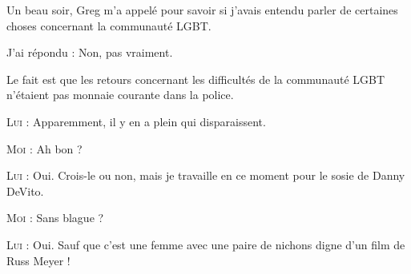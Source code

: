 Un beau soir, Greg m’a appelé pour savoir si j’avais entendu parler de certaines choses concernant la communauté LGBT.

\begin{dialogue}

J’ai répondu : Non, pas vraiment.

\end{dialogue}

Le fait est que les retours concernant les difficultés de la communauté LGBT n’étaient pas monnaie courante dans la police.

\begin{dialogue}

\textsc{Lui} : Apparemment, il y en a plein qui disparaissent.

\textsc{Moi} : Ah bon ?

\textsc{Lui} : Oui. Crois-le ou non, mais je travaille en ce moment pour le sosie de Danny DeVito.

\textsc{Moi} : Sans blague ?

\textsc{Lui} : Oui. Sauf que c’est une femme avec une paire de nichons digne d’un film de Russ Meyer !

\end{dialogue}

